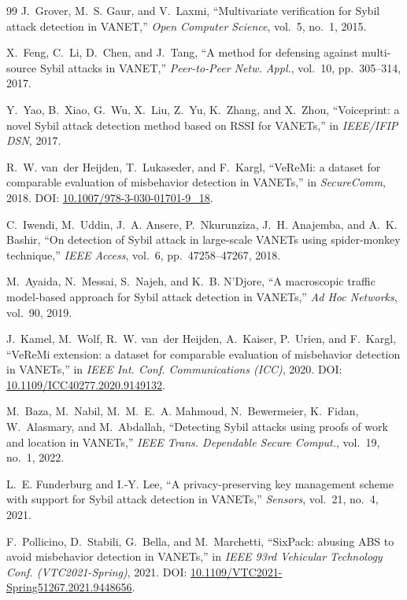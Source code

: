 \documentclass[conference]{IEEEtran}
\begin{document}
\begin{thebibliography}{99}
 J.~Grover, M.~S. Gaur, and V.~Laxmi, ``Multivariate verification for Sybil attack detection in VANET,'' \emph{Open Computer Science}, vol.~5, no.~1, 2015.

 X.~Feng, C.~Li, D.~Chen, and J.~Tang, ``A method for defensing against multi-source Sybil attacks in VANET,'' \emph{Peer-to-Peer Netw. Appl.}, vol.~10, pp.~305--314, 2017.

 Y.~Yao, B.~Xiao, G.~Wu, X.~Liu, Z.~Yu, K.~Zhang, and X.~Zhou, ``Voiceprint: a novel Sybil attack detection method based on RSSI for VANETs,'' in \emph{IEEE/IFIP DSN}, 2017.

 R.~W. van~der Heijden, T.~Lukaseder, and F.~Kargl, ``VeReMi: a dataset for comparable evaluation of misbehavior detection in VANETs,'' in \emph{SecureComm}, 2018. DOI: \url{10.1007/978-3-030-01701-9\_18}.

 C.~Iwendi, M.~Uddin, J.~A. Ansere, P.~Nkurunziza, J.~H. Anajemba, and A.~K. Bashir, ``On detection of Sybil attack in large-scale VANETs using spider-monkey technique,'' \emph{IEEE Access}, vol.~6, pp.~47258--47267, 2018.

 M.~Ayaida, N.~Messai, S.~Najeh, and K.~B. N'Djore, ``A macroscopic traffic model-based approach for Sybil attack detection in VANETs,'' \emph{Ad Hoc Networks}, vol.~90, 2019.

 J.~Kamel, M.~Wolf, R.~W. van~der Heijden, A.~Kaiser, P.~Urien, and F.~Kargl, ``VeReMi extension: a dataset for comparable evaluation of misbehavior detection in VANETs,'' in \emph{IEEE Int. Conf. Communications (ICC)}, 2020. DOI: \url{10.1109/ICC40277.2020.9149132}.

 M.~Baza, M.~Nabil, M.~M.~E.~A. Mahmoud, N.~Bewermeier, K.~Fidan, W.~Alasmary, and M.~Abdallah, ``Detecting Sybil attacks using proofs of work and location in VANETs,'' \emph{IEEE Trans. Dependable Secure Comput.}, vol.~19, no.~1, 2022.

 L.~E. Funderburg and I.-Y. Lee, ``A privacy-preserving key management scheme with support for Sybil attack detection in VANETs,'' \emph{Sensors}, vol.~21, no.~4, 2021.

 F.~Pollicino, D.~Stabili, G.~Bella, and M.~Marchetti, ``SixPack: abusing ABS to avoid misbehavior detection in VANETs,'' in \emph{IEEE 93rd Vehicular Technology Conf. (VTC2021-Spring)}, 2021. DOI: \url{10.1109/VTC2021-Spring51267.2021.9448656}.


\end{thebibliography}
\end{document}
